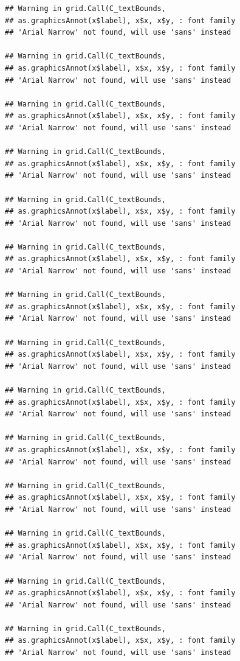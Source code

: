 \documentclass[]{krantz}
\begin{document}
\begin{verbatim}
## Warning in grid.Call(C_textBounds,
## as.graphicsAnnot(x$label), x$x, x$y, : font family
## 'Arial Narrow' not found, will use 'sans' instead

## Warning in grid.Call(C_textBounds,
## as.graphicsAnnot(x$label), x$x, x$y, : font family
## 'Arial Narrow' not found, will use 'sans' instead

## Warning in grid.Call(C_textBounds,
## as.graphicsAnnot(x$label), x$x, x$y, : font family
## 'Arial Narrow' not found, will use 'sans' instead

## Warning in grid.Call(C_textBounds,
## as.graphicsAnnot(x$label), x$x, x$y, : font family
## 'Arial Narrow' not found, will use 'sans' instead

## Warning in grid.Call(C_textBounds,
## as.graphicsAnnot(x$label), x$x, x$y, : font family
## 'Arial Narrow' not found, will use 'sans' instead

## Warning in grid.Call(C_textBounds,
## as.graphicsAnnot(x$label), x$x, x$y, : font family
## 'Arial Narrow' not found, will use 'sans' instead

## Warning in grid.Call(C_textBounds,
## as.graphicsAnnot(x$label), x$x, x$y, : font family
## 'Arial Narrow' not found, will use 'sans' instead

## Warning in grid.Call(C_textBounds,
## as.graphicsAnnot(x$label), x$x, x$y, : font family
## 'Arial Narrow' not found, will use 'sans' instead

## Warning in grid.Call(C_textBounds,
## as.graphicsAnnot(x$label), x$x, x$y, : font family
## 'Arial Narrow' not found, will use 'sans' instead

## Warning in grid.Call(C_textBounds,
## as.graphicsAnnot(x$label), x$x, x$y, : font family
## 'Arial Narrow' not found, will use 'sans' instead

## Warning in grid.Call(C_textBounds,
## as.graphicsAnnot(x$label), x$x, x$y, : font family
## 'Arial Narrow' not found, will use 'sans' instead

## Warning in grid.Call(C_textBounds,
## as.graphicsAnnot(x$label), x$x, x$y, : font family
## 'Arial Narrow' not found, will use 'sans' instead

## Warning in grid.Call(C_textBounds,
## as.graphicsAnnot(x$label), x$x, x$y, : font family
## 'Arial Narrow' not found, will use 'sans' instead

## Warning in grid.Call(C_textBounds,
## as.graphicsAnnot(x$label), x$x, x$y, : font family
## 'Arial Narrow' not found, will use 'sans' instead


\end{verbatim}
\end{document}
